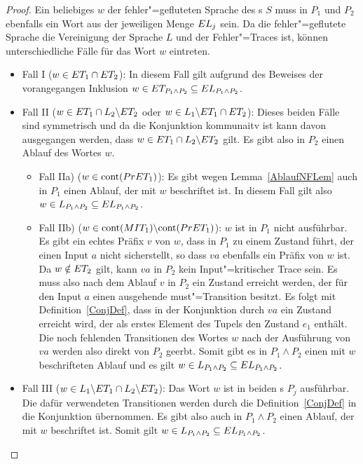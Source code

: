 \begin{proof}
  Ein beliebiges $w$ der fehler"=gefluteten Sprache des \MEIO{}s $S$ muss
  in $P_1$ und $P_2$ ebenfalls ein Wort aus der jeweiligen Menge $EL _j$ sein.
  Da die fehler"=geflutete Sprache die Vereinigung der Sprache $L$ und der
  Fehler"=Traces \ET{} ist, können unterschiedliche Fälle für das Wort $w$
  eintreten.
  \begin{itemize}
    \item Fall I ($w\in ET _1\cap ET _2$): In diesem Fall gilt aufgrund des
      Beweises der vorangegangen Inklusion $w\in ET _{P_1\land P_2}\subseteq
      EL _{P_1\land P_2}$.
    \item Fall II ($w\in ET _1\cap L_2\backslash ET _2$ oder $w\in
      L_1\backslash ET _1\cap ET _2$): Dieses beiden Fälle sind symmetrisch
      und da die Konjunktion kommunaitv ist kann \oBdA{} davon ausgegangen
      werden, dass $w\in ET _1\cap L_2\backslash ET _2$ gilt. Es gibt also in
      $P_2$ einen Ablauf des Wortes $w$.
      \begin{itemize}
        \item Fall IIa) ($w\in\mathrm{cont} (PrET _1)$): Es gibt wegen
          Lemma~\ref{AblaufNFLem} auch in $P_1$ einen Ablauf, der mit $w$
          beschriftet ist. In diesem Fall gilt also $w\in L_{P_1\land P_2}
          \subseteq EL _{P_1\land P_2}$.
        \item Fall IIb) ($w\in\mathrm{cont} (MIT _1)\backslash\mathrm{cont} (PrET _1)$): $w$
          ist in $P_1$ nicht ausführbar. Es gibt ein echtes Präfix $v$ von $w$,
          dass in $P_1$ zu einem Zustand führt, der einen Input $a$ nicht
          sicherstellt, so dass $va$ ebenfalls ein Präfix von $w$ ist. Da
          $w\notin ET _2$ gilt, kann $va$ in $P_2$ kein Input"=kritischer
          Trace sein. Es muss also nach dem Ablauf $v$ in $P_2$ ein Zustand
          erreicht werden, der für den Input $a$ einen ausgehende
          must"=Transition besitzt. Es folgt mit Definition~\ref{ConjDef}, dass
          in der Konjunktion durch $va$ ein Zustand erreicht wird, der als
          erstes Element des Tupels den Zustand $e_1$ enthält. Die noch
          fehlenden Transitionen des Wortes $w$ nach der Ausführung von $va$
          werden also direkt von $P_2$ geerbt. Somit gibt es in $P_1\land P_2$
          einen mit $w$ beschrifteten Ablauf und es gilt $w\in L_{P_1\land P_2}
          \subseteq EL _{P_1\land P_2}$.
      \end{itemize}
    \item Fall III ($w\in L_1\backslash ET _1 \cap L_2\backslash ET _2$): Das
      Wort $w$ ist in beiden \MEIO{}s $P_j$ ausführbar. Die dafür verwendeten
      Transitionen werden durch die Definition~\ref{ConjDef} in die Konjunktion
      übernommen. Es gibt also auch in $P_1\land P_2$ einen Ablauf, der mit $w$
      beschriftet ist. Somit gilt $w\in L_{P_1\land P_2}\subseteq EL
      _{P_1\land P_2}$.
  \end{itemize}


\end{proof}
